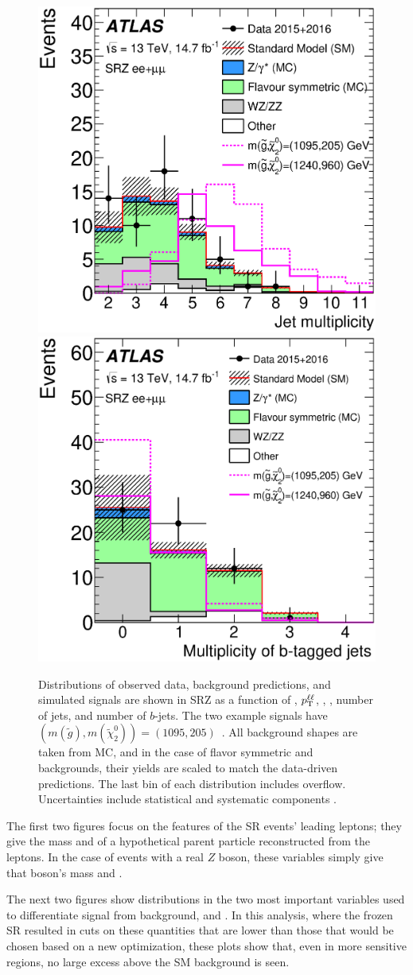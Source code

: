 \begin{centering}
\begin{figure}[!hbt]
\includegraphics[width=.48\linewidth]{figures/results/njets_ee_mm_srz_R_a.eps}
\includegraphics[width=.48\linewidth]{figures/results/nbjets_ee_mm_srz_R_a.eps}
\caption{ Distributions of observed data, background predictions, and simulated signals are shown in SRZ as a function of \mll, $p_{\text{T}}^{\ell\ell}$, \met, \HT, number of jets, and number of $b$-jets. The two example signals have $(m(\tilde{g}),m(\tilde{\chi}^{0}_{2}))=(1095, 205)$~\GeV. All background shapes are taken from \ac{MC}, and in the case of flavor symmetric and \dyjets backgrounds, their yields are scaled to match the data-driven predictions. The last bin of each distribution includes overflow. Uncertainties include statistical and systematic components \cite{this_paper}.}
\label{fig:results_srdists}
\end{figure}
\end{centering}

The first two figures focus on the features of the \ac{SR} events' leading leptons; they give the mass and \pt of a hypothetical parent particle reconstructed from the leptons. In the case of events with a real $Z$ boson, these variables simply give that boson's mass and \pt. 

The next two figures show distributions in the two most important variables used to differentiate signal from background, \met and \HT. In this analysis, where the frozen \ac{SR} resulted in cuts on these quantities that are lower than those that would be chosen based on a new optimization, these plots show that, even in more sensitive regions, no large excess above the \ac{SM} background is seen. 

